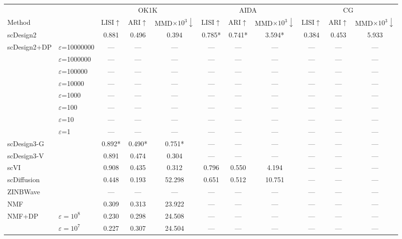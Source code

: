 \begin{tabular}{ll|ccc|ccc|ccc}
\toprule
 & & \multicolumn{3}{c|}{OK1K} & \multicolumn{3}{c|}{AIDA} & \multicolumn{3}{c}{CG} \\
Method & & LISI$\uparrow$ & ARI$\uparrow$ & MMD$\times 10^3\downarrow$ & LISI$\uparrow$ & ARI$\uparrow$ & MMD$\times 10^3\downarrow$ & LISI$\uparrow$ & ARI$\uparrow$ & MMD$\times 10^3\downarrow$ \\
\midrule
scDesign2 &  & 0.881 & 0.496 & 0.394 & 0.785* & 0.741* & 3.594* & 0.384 & 0.453 & 5.933 \\
scDesign2+DP & $\varepsilon$=10000000 & --- & --- & --- & --- & --- & --- & --- & --- & --- \\
 & $\varepsilon$=1000000 & --- & --- & --- & --- & --- & --- & --- & --- & --- \\
 & $\varepsilon$=100000 & --- & --- & --- & --- & --- & --- & --- & --- & --- \\
 & $\varepsilon$=10000 & --- & --- & --- & --- & --- & --- & --- & --- & --- \\
 & $\varepsilon$=1000 & --- & --- & --- & --- & --- & --- & --- & --- & --- \\
 & $\varepsilon$=100 & --- & --- & --- & --- & --- & --- & --- & --- & --- \\
 & $\varepsilon$=10 & --- & --- & --- & --- & --- & --- & --- & --- & --- \\
 & $\varepsilon$=1 & --- & --- & --- & --- & --- & --- & --- & --- & --- \\
\addlinespace[2pt]
scDesign3-G &  & 0.892* & 0.490* & 0.751* & --- & --- & --- & --- & --- & --- \\
\addlinespace[2pt]
scDesign3-V &  & 0.891 & 0.474 & 0.304 & --- & --- & --- & --- & --- & --- \\
\addlinespace[2pt]
scVI &  & 0.908 & 0.435 & 0.312 & 0.796 & 0.550 & 4.194 & --- & --- & --- \\
\addlinespace[2pt]
scDiffusion &  & 0.448 & 0.193 & 52.298 & 0.651 & 0.512 & 10.751 & --- & --- & --- \\
\addlinespace[2pt]
ZINBWave &  & --- & --- & --- & --- & --- & --- & --- & --- & --- \\
\addlinespace[2pt]
NMF &  & 0.309 & 0.313 & 23.922 & --- & --- & --- & --- & --- & --- \\
\addlinespace[2pt]
NMF+DP & $\varepsilon=10^{8}$ & 0.230 & 0.298 & 24.508 & --- & --- & --- & --- & --- & --- \\
 & $\varepsilon=10^{7}$ & 0.227 & 0.307 & 24.504 & --- & --- & --- & --- & --- & --- \\

\end{tabular}
